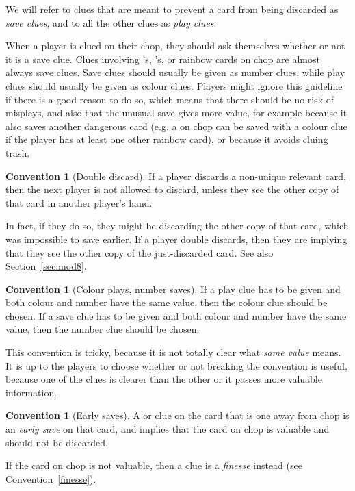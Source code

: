 \documentclass[a4paper]{article}
\theoremstyle{plain}
\theoremstyle{definition}
\newtheorem{convention}[theorem]{Convention}
\begin{document}
We will refer to clues that are meant to prevent a card from being discarded as \textit{save clues}, and to all the other clues as \textit{play clues}.

When a player is clued on their chop, they should ask themselves whether or not it is a save clue. Clues involving 's, 's, or rainbow cards on chop are almost always save clues. Save clues should usually be given as number clues, while play clues should usually be given as colour clues. Players might ignore this guideline if there is a good reason to do so, which means that there should be no risk of misplays, and also that the unusual save gives more value, for example because it also saves another dangerous card (e.g. a  on chop can be saved with a colour clue if the player has at least one other rainbow card), or because it avoids cluing trash.

\begin{convention}[Double discard]
	\label{double-discard}
	If a player discards a non-unique relevant card, then the next player is not allowed to discard, unless they see the other copy of that card in another player's hand.
\end{convention}

In fact, if they do so, they might be discarding the other copy of that card, which was impossible to save earlier. If a player double discards, then they are implying that they see the other copy of the just-discarded card. See also Section~\ref{sec:mod8}.

\begin{convention}[Colour plays, number saves]
	If a play clue has to be given and both colour and number have the same value, then the colour clue should be chosen. If a save clue has to be given and both colour and number have the same value, then the number clue should be chosen.
\end{convention}

This convention is tricky, because it is not totally clear what \textit{same value} means. It is up to the players to choose whether or not breaking the convention is useful, because one of the clues is clearer than the other or it passes more valuable information.

\begin{convention}[Early saves]
	A  or  clue on the card that is one away from chop is an \textit{early save} on that card, and implies that the card on chop is valuable and should not be discarded.
	
	If the card on chop is not valuable, then a  clue is a \textit{finesse} instead (see Convention~\ref{finesse}).
\end{convention}
\end{document}
